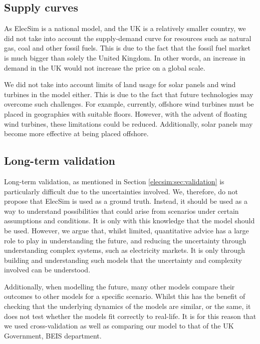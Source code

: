 \subsection*{Supply curves}

As ElecSim is a national model, and the UK is a relatively smaller country, we did not take into account the supply-demand curve for resources such as natural gas, coal and other fossil fuels. This is due to the fact that the fossil fuel market is much bigger than solely the United Kingdom. In other words, an increase in demand in the UK would not increase the price on a global scale. 

We did not take into account limits of land usage for solar panels and wind turbines in the model either. This is due to the fact that future technologies may overcome such challenges. For example, currently, offshore wind turbines must be placed in geographies with suitable floors. However, with the advent of floating wind turbines, these limitations could be reduced. Additionally, solar panels may become more effective at being placed offshore.


\subsection*{Long-term validation}

Long-term validation, as mentioned in Section \ref{elecsim:sec:validation} is particularly difficult due to the uncertainties involved. We, therefore, do not propose that ElecSim is used as a ground truth. Instead, it should be used as a way to understand possibilities that could arise from scenarios under certain assumptions and conditions. It is only with this knowledge that the model should be used. However, we argue that, whilst limited, quantitative advice has a large role to play in understanding the future, and reducing the uncertainty through understanding complex systems, such as electricity markets. It is only through building and understanding such models that the uncertainty and complexity involved can be understood. 

Additionally, when modelling the future, many other models compare their outcomes to other models for a specific scenario. Whilst this has the benefit of checking that the underlying dynamics of the models are similar, or the same, it does not test whether the models fit correctly to real-life. It is for this reason that we used cross-validation as well as comparing our model to that of the UK Government, BEIS department.


